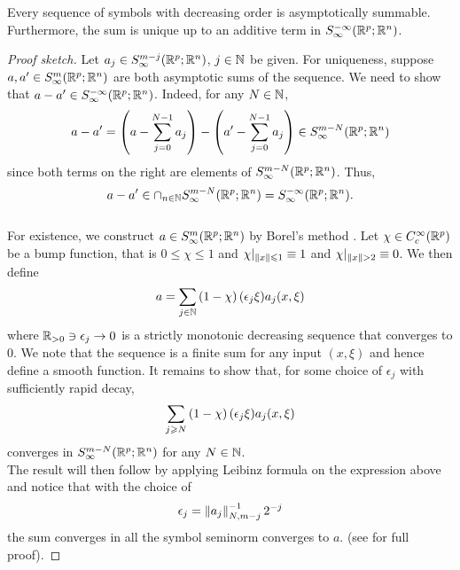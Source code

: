 \documentclass[12pt]{article}
\begin{document}
\begin{flemma}
    Every sequence of symbols with decreasing order is asymptotically summable.  Furthermore, the sum is unique up to an additive term in $S^{-\infty}_\infty(\R^{p}; \R^n)$. 
\end{flemma}
\begin{proof}[Proof sketch]
    Let $a_j \in S^{m-j}_\infty(\R^{p}; \R^n)$, $j \in \N$ be given. For uniqueness, suppose $a, a' \in S^{m}_\infty(\R^{p}; \R^n)$ are both asymptotic sums of the sequence. We need to show that $a - a' \in S^{-\infty}_\infty(\R^{p}; \R^n)$. Indeed, for any $N \in \N$, 
    \begin{align*}
        a - a' = \brac{a - \sum_{j = 0}^{N -1} a_j } - \brac{a' - \sum_{j = 0}^{N -1} a_j } \in S^{m -N}_\infty(\R^{p}; \R^n)
    \end{align*}
    since both terms on the right are elements of $S^{m -N}_\infty(\R^{p}; \R^n)$. Thus, 
    $$a - a' \in \cap_{n \in \N} S^{m -N}_\infty(\R^{p}; \R^n) = S^{-\infty}_\infty(\R^{p}; \R^n).$$ 
    \\
    For existence, we construct $a \in S^{m}_\infty(\R^{p}; \R^n)$ by Borel's method \cite{Hormander2012-sh}. Let $\chi \in C^{\infty}_c(\R^p)$ be a bump function, that is $0 \leq \chi \leq 1$ and $\chi|_{\norm[x] \leq 1} \equiv 1$ and $\chi|_{\norm[x] >2} \equiv 0$. We then define
    \begin{align*}
        a = \sum_{j \in \N} \brac{1 - \chi}(\epsilon_j \xi) a_j(x, \xi)
    \end{align*}
    where $\R_{> 0} \ni \epsilon_j \to 0 $ is a strictly monotonic decreasing sequence that converges to $0$. We note that the sequence is a finite sum for any input $(x, \xi)$ and hence define a smooth function. It remains to show that, for some choice of $\epsilon_j$ with sufficiently rapid decay, 
    \begin{align*}
        \sum_{j \geq N} \brac{1 - \chi}(\epsilon_j \xi) a_j(x, \xi) 
    \end{align*}
    converges in $S^{m -N}_\infty(\R^{p}; \R^n)$ for any $N \in \N$. 
    \\
    The result will then follow by applying Leibinz formula on the expression above and notice that with the choice of 
    \begin{align*}
    \epsilon_j = \norm[a_{j}]_{N, m - j}^{-1} 2^{-j}
    \end{align*}
    the sum converges in all the  symbol seminorm converges to $a$. (see \cite[Chapter 2]{rbm_intro_microlocal} for full proof). 
    
\end{proof}
\end{document}
